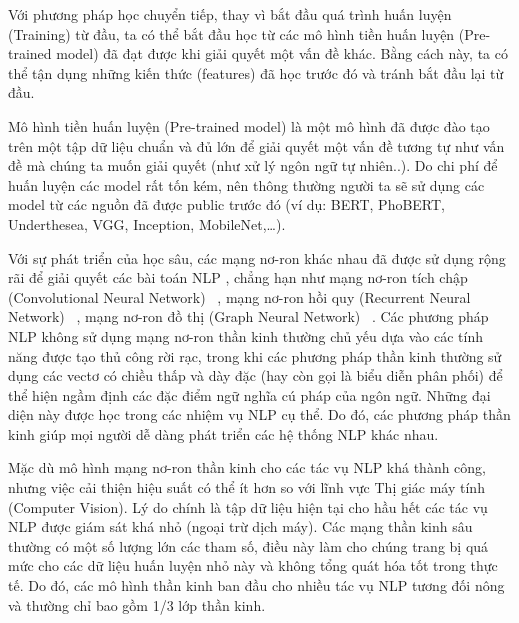 \documentclass[conference]{IEEEtran}
\begin{document}
Với phương pháp học chuyển tiếp, thay vì bắt đầu quá trình huấn luyện (Training) từ đầu, ta có thể bắt đầu học từ các mô hình tiền huấn luyện (Pre-trained model) đã đạt được khi giải quyết một vấn đề khác. Bằng cách này, ta có thể tận dụng những kiến thức (features) đã học trước đó và tránh bắt đầu lại từ đầu.

Mô hình tiền huấn luyện (Pre-trained model) là một mô hình đã được đào tạo trên một tập dữ liệu chuẩn và đủ lớn để giải quyết một vấn đề tương tự như vấn đề mà chúng ta muốn giải quyết (như xử lý ngôn ngữ tự nhiên..). Do chi phí để huấn luyện các model rất tốn kém, nên thông thường người ta sẽ sử dụng các model từ các nguồn đã được public trước đó (ví dụ: BERT, PhoBERT, Underthesea, VGG, Inception, MobileNet,…).

Với sự phát triển của học sâu, các mạng nơ-ron khác nhau đã được sử dụng rộng rãi để giải quyết các bài toán NLP , chẳng hạn như mạng nơ-ron tích chập (Convolutional Neural Network) ~\cite{gehring2017convolutional, kalchbrenner-etal-2014-convolutional, kim-2014-convolutional}, mạng nơ-ron hồi quy (Recurrent Neural Network) ~\cite{sutskever-2014-sequence, liu-2016-recurrent}, mạng nơ-ron đồ thị (Graph Neural Network) ~\cite{socher-2013-recursivedeep, tai2015improved, marcheggiani2018exploiting}. Các phương pháp NLP không sử dụng mạng nơ-ron thần kinh thường chủ yếu dựa vào các tính năng được tạo thủ công rời rạc, trong khi các phương pháp thần kinh thường sử dụng các vectơ có chiều thấp và dày đặc (hay còn gọi là biểu diễn phân phối) để thể hiện ngầm định các đặc điểm ngữ nghĩa cú pháp của ngôn ngữ. Những đại diện này được học trong các nhiệm vụ NLP cụ thể. Do đó, các phương pháp thần kinh giúp mọi người dễ dàng phát triển các hệ thống NLP khác nhau.

Mặc dù mô hình mạng nơ-ron thần kinh cho các tác vụ NLP khá thành công, nhưng việc cải thiện hiệu suất có thể ít hơn so với lĩnh vực Thị giác máy tính (Computer Vision). Lý do chính là tập dữ liệu hiện tại cho hầu hết các tác vụ NLP được giám sát khá nhỏ (ngoại trừ dịch máy). Các mạng thần kinh sâu thường có một số lượng lớn các tham số, điều này làm cho chúng trang bị quá mức cho các dữ liệu huấn luyện nhỏ này và không tổng quát hóa tốt trong thực tế. Do đó, các mô hình thần kinh ban đầu cho nhiều tác vụ NLP tương đối nông và thường chỉ bao gồm 1/3 lớp thần kinh.
\end{document}
